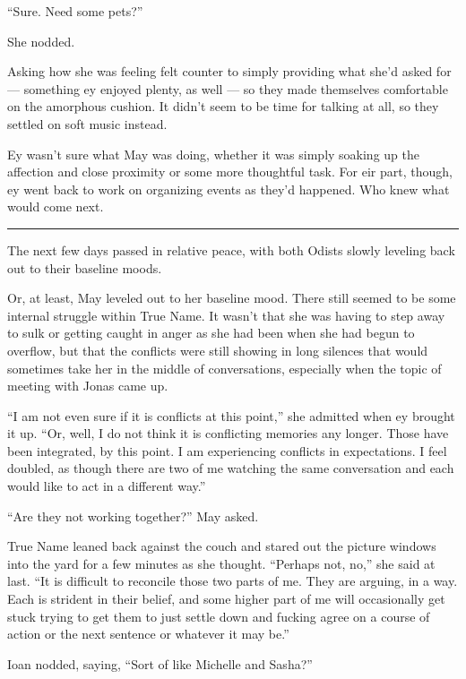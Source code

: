 ``Sure. Need some pets?''

She nodded.

Asking how she was feeling felt counter to simply providing what she'd asked for — something ey enjoyed plenty, as well — so they made themselves comfortable on the amorphous cushion. It didn't seem to be time for talking at all, so they settled on soft music instead.

Ey wasn't sure what May was doing, whether it was simply soaking up the affection and close proximity or some more thoughtful task. For eir part, though, ey went back to work on organizing events as they'd happened. Who knew what would come next.

\begin{center}\rule{0.5\linewidth}{0.5pt}\end{center}

The next few days passed in relative peace, with both Odists slowly leveling back out to their baseline moods.

Or, at least, May leveled out to her baseline mood. There still seemed to be some internal struggle within True Name. It wasn't that she was having to step away to sulk or getting caught in anger as she had been when she had begun to overflow, but that the conflicts were still showing in long silences that would sometimes take her in the middle of conversations, especially when the topic of meeting with Jonas came up.

``I am not even sure if it is conflicts at this point,'' she admitted when ey brought it up. ``Or, well, I do not think it is conflicting memories any longer. Those have been integrated, by this point. I am experiencing conflicts in expectations. I feel doubled, as though there are two of me watching the same conversation and each would like to act in a different way.''

``Are they not working together?'' May asked.

True Name leaned back against the couch and stared out the picture windows into the yard for a few minutes as she thought. ``Perhaps not, no,'' she said at last. ``It is difficult to reconcile those two parts of me. They are arguing, in a way. Each is strident in their belief, and some higher part of me will occasionally get stuck trying to get them to just settle down and fucking agree on a course of action or the next sentence or whatever it may be.''

Ioan nodded, saying, ``Sort of like Michelle and Sasha?''

